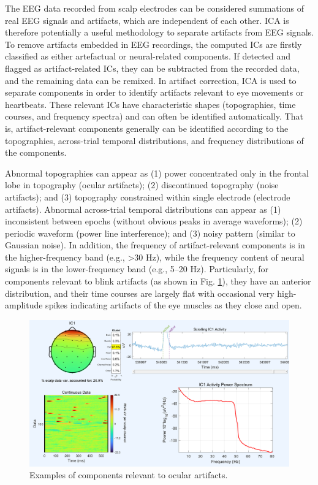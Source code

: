 \documentclass[12pt,a4paper,titlepage,openany]{report}
\begin{document}
The EEG data recorded from scalp electrodes can be considered summations of real EEG signals and artifacts, which are independent of each other. ICA is therefore potentially a useful methodology to separate artifacts from EEG signals. To remove artifacts embedded in EEG recordings, the computed ICs are ﬁrstly classiﬁed as either artefactual or neural-related components. If detected and ﬂagged as artifact-related ICs, they can be subtracted from the recorded data, and the remaining data can be remixed. In artifact correction, ICA is used to separate components in order to identify artifacts relevant to eye movements or heartbeats. 
These relevant ICs have characteristic shapes (topographies, time courses, and frequency spectra) and can often be identiﬁed automatically. 
That is, artifact-relevant components generally can be identiﬁed according to the topographies, across-trial temporal distributions, and frequency distributions of the components. 

Abnormal topographies can appear as (1) power concentrated only in the frontal lobe in topography (ocular artifacts); (2) discontinued topography (noise artifacts); and (3) topography constrained within single electrode (electrode artifacts). 
Abnormal across-trial temporal distributions can appear as (1) inconsistent between epochs (without obvious peaks in average waveforms); (2) periodic waveform (power line interference); and (3) noisy pattern (similar to Gaussian noise). 
In addition, the frequency of artifact-relevant components is in the higher-frequency band (e.g., \textgreater 30 Hz), while the frequency content of neural signals is in the lower-frequency band (e.g., 5–20 Hz). 
Particularly, for components relevant to blink artifacts (as shown in Fig. \ref{fig:ICA}), they have an anterior distribution, and their time courses are largely ﬂat with occasional very high-amplitude spikes indicating artifacts of the eye muscles as they close and open.

\begin{figure}[H]
     \centering
     \includegraphics[width=1\linewidth]{./Chapter3_Methodology/Eye-blink via ICA label.png}
     \caption{Examples of components relevant to ocular artifacts.}
     \label{fig:ICA}
\end{figure}
\end{document}
